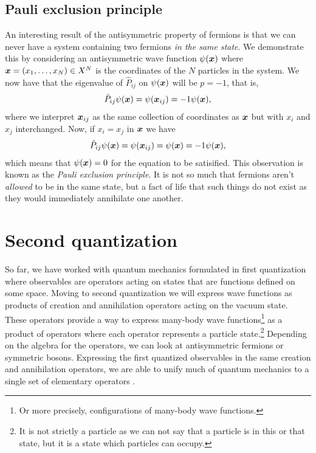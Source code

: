         \subsection{Pauli exclusion principle}
            An interesting result of the antisymmetric property of fermions is
            that we can never have a system containing two fermions \emph{in the
            same state}.
            We demonstrate this by considering an antisymmetric wave function
            $\psi(\boldsymbol{x})$ where $\boldsymbol{x} = (x_1, \dots, x_N) \in X^{N}$ is the
            coordinates of the $N$ particles in the system.
            We now have that the eigenvalue of $\hat{P}_{ij}$ on $\psi(\boldsymbol{x})$
            will be $p = -1$, that is,
            \begin{align}
                \hat{P}_{ij}\psi(\boldsymbol{x})
                = \psi(\boldsymbol{x}_{ij})
                = -1\psi(\boldsymbol{x}),
            \end{align}
            where we interpret $\boldsymbol{x}_{ij}$ as the same collection of
            coordinates as $\boldsymbol{x}$ but with $x_i$ and $x_j$ interchanged.
            Now, if $x_i = x_j$ in $\boldsymbol{x}$ we have
            \begin{gather}
                \hat{P}_{ij}\psi(\boldsymbol{x})
                = \psi(\boldsymbol{x}_{ij})
                = \psi(\boldsymbol{x})
                = -1\psi(\boldsymbol{x}),
            \end{gather}
            which means that $\psi(\boldsymbol{x}) = 0$ for the equation to be
            satisified.
            This observation is known as the \emph{Pauli exclusion
            principle}.
            It is not so much that fermions aren't \emph{allowed} to be in the
            same state, but a fact of life that such things do not exist as they
            would immediately annihilate one another.


    \section{Second quantization}
        So far, we have worked with quantum mechanics formulated in first
        quantization where observables are operators acting on states that are
        functions defined on some space.
        Moving to second quantization we will express wave functions as products
        of creation and annihilation operators acting on the vacuum state.
        These operators provide a way to express many-body wave
        functions\footnote{%
            Or more precisely, configurations of many-body wave functions.%
        } as a product of operators where each operator represents a particle
        state.\footnote{%
            It is not strictly a particle as we can not say that a particle is
            in this or that state, but it is a state which particles can occupy.
        }
        Depending on the algebra for the operators, we can look at antisymmetric
        fermions or symmetric bosons.
        Expressing the first quantized observables in the same creation and
        annihilation operators, we are able to unify much of quantum mechanics
        to a single set of elementary operators \cite{helgaker-molecular}.

